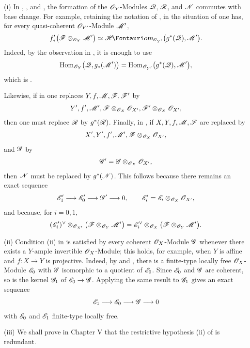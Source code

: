 \begin{remarks}[7.7.9]
\label{III.7.7.9}
\textnormal{(i)}
In , , and
, the formation of the $\mathscr{O}_Y$-Modules
$\mathscr{Q}$, $\mathscr{R}$, and $\mathscr{N}$ commutes with base change.
For example, retaining the notation of , in
the situation of  one has, for every
quasi-coherent $\mathscr{O}_{Y'}$-Module $\mathscr{M}'$,
\[
  f'_*
  \bigl(\sh{F}\otimes_{\sh{O}_Y}\sh{M}'\bigr)
  \simeq
  \shHom_{\sh{O}_{Y'}}
  \bigl(g^*(\sh{Q}),\sh{M}'\bigr).
\]
Indeed, by the observation in , it is enough
to use
\[
  \operatorname{Hom}_{\mathscr{O}_Y}
  \bigl(\mathscr{Q},g_*(\mathscr{M}')\bigr)
  =
  \operatorname{Hom}_{\mathscr{O}_{Y'}}
  \bigl(g^*(\mathscr{Q}),\mathscr{M}'\bigr),
\]
which is .

Likewise, if in  one replaces
$Y,f,\mathscr{M},\mathscr{F},\mathscr{F}'$ by
\[
  Y',f',\mathscr{M}',
  \mathscr{F}\otimes_{\mathscr{O}_X}\mathscr{O}_{X'},
  \mathscr{F}'\otimes_{\mathscr{O}_X}\mathscr{O}_{X'},
\]
then one must replace $\mathscr{R}$ by $g^*(\mathscr{R})$.
Finally, in , if
$X,Y,f,\mathscr{M},\mathscr{F}$ are replaced by
\[
  X',Y',f',\mathscr{M}',
  \mathscr{F}\otimes_{\mathscr{O}_X}\mathscr{O}_{X'},
\]
and $\mathscr{G}$ by
\[
  \mathscr{G}'
  =
  \mathscr{G}\otimes_{\mathscr{O}_X}\mathscr{O}_{X'},
\]
then $\mathscr{N}$ must be replaced by $g^*(\mathscr{N})$.  This
follows because there remains an exact sequence
\[
  \mathscr{E}'_1\longrightarrow
  \mathscr{E}'_0\longrightarrow
  \mathscr{G}'\longrightarrow0,
  \qquad
  \mathscr{E}'_i
  =
  \mathscr{E}_i\otimes_{\mathscr{O}_X}\mathscr{O}_{X'},
\]
and because, for $i=0,1$,
\[
  (\mathscr{E}'_i)^\vee
  \otimes_{\mathscr{O}_{X'}}
  \bigl(\mathscr{F}\otimes_{\mathscr{O}_Y}\mathscr{M}'\bigr)
  =
  \mathscr{E}_i^\vee
  \otimes_{\mathscr{O}_X}
  \bigl(\mathscr{F}\otimes_{\mathscr{O}_Y}\mathscr{M}'\bigr).
\]

\medskip
\textnormal{(ii)}
Condition (ii) in  is satisfied by every
coherent $\mathscr{O}_X$-Module $\mathscr{G}$ whenever there exists a
$Y$-ample invertible $\mathscr{O}_X$-Module; this holds, for
example, when $Y$ is affine and $f:X\to Y$ is projective.
Indeed, by  and ,
there is a finite-type locally free $\mathscr{O}_X$-Module
$\mathscr{E}_0$ with $\mathscr{G}$ isomorphic to a quotient of
$\mathscr{E}_0$.  Since $\mathscr{E}_0$ and $\mathscr{G}$ are coherent, so
is the kernel $\mathscr{G}_1$ of $\mathscr{E}_0\to\mathscr{G}$.  Applying
the same result to $\mathscr{G}_1$ gives an exact sequence
\[
  \mathscr{E}_1\longrightarrow
  \mathscr{E}_0\longrightarrow
  \mathscr{G}\longrightarrow0
\]
with $\mathscr{E}_0$ and $\mathscr{E}_1$ finite-type locally free.

\medskip
\textnormal{(iii)}
We shall prove in Chapter V that the restrictive hypothesis
(ii) of  is redundant.
\end{remarks}

